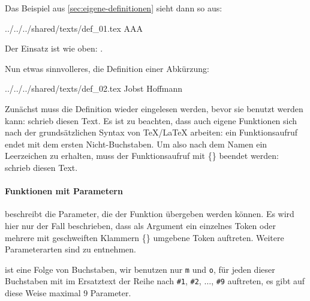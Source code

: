 Das Beispiel aus \cref{sec:eigene-definitionen} sieht dann so aus:
\begin{verbatimwrite}{../../../shared/texts/def_01.tex}
\NewDocumentCommand{\iiiA}        %
                   {}             %
                   {AAA}          %
\end{verbatimwrite}


Der Einsatz ist wie oben: \iiiA.

Nun etwas sinnvolleres, die Definition einer Abkürzung:
\begin{verbatimwrite}{../../../shared/texts/def_02.tex}
\NewDocumentCommand{\JHf}       %
                   {}           %
                   {Jobst Hoffmann}  %
\end{verbatimwrite}



Zunächst muss die Definition wieder eingelesen werden, bevor sie
benutzt werden kann: \JHf schrieb diesen Text. Es ist zu beachten,
dass auch eigene Funktionen sich nach der grundsätzlichen Syntax von
\TeX/\LaTeX{} arbeiten: ein Funktionsaufruf endet mit dem ersten
Nicht-Buchstaben. Um also nach dem Namen ein Leerzeichen zu erhalten,
muss der Funktionsaufruf mit \{\} beendet werden: \JHf{} schrieb
diesen Text.

\paragraph{Funktionen mit Parametern}

 beschreibt die Parameter, die der Funktion übergeben werden
können. Es wird hier nur der Fall beschrieben, dass als Argument ein
einzelnes Token oder mehrere mit geschweiften Klammern \{\} umgebene Token
auftreten. Weitere Parameterarten sind \cite{latex_project_22:xparse} zu
entnehmen.

 ist eine Folge von Buchstaben, wir benutzen nur \texttt{m} und 
\texttt{o}, für jeden dieser Buchstaben mit im Ersatztext der Reihe nach
\lstinline|#1|, \lstinline|#2|, $\ldots$, \lstinline|#9| auftreten, es gibt
auf diese Weise maximal 9 Parameter.


